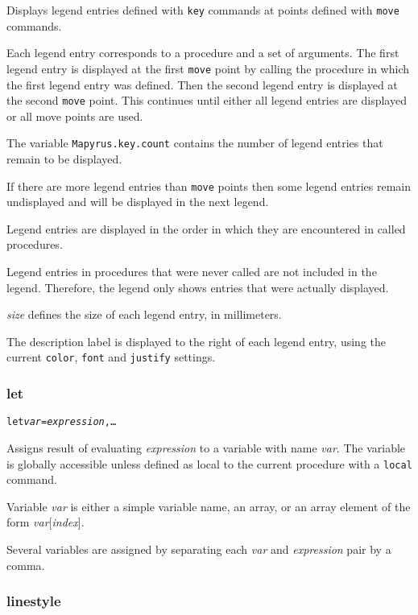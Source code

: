 Displays legend entries defined with
\texttt{key} commands at points defined with
\texttt{move} commands.

Each legend entry corresponds to a procedure and a set of arguments.  The first
legend entry is displayed at the first \texttt{move} point by calling the
procedure in which the first legend entry was defined.  Then the second legend
entry is displayed at the second \texttt{move} point.  This continues until
either all legend entries are displayed or all move points are used.

The variable
\texttt{Mapyrus.key.count}
contains the number of legend entries that remain to be displayed.

If there are more legend entries than 
\texttt{move} points then some legend entries
remain undisplayed and will be displayed in the next legend.

Legend entries are displayed in the order in which they
are encountered in called procedures.

Legend entries in procedures that were never called are
not included in the legend.  Therefore, the legend only shows
entries that were actually displayed.

\textit{size} defines the size of each legend entry, in millimeters.

The description label is displayed to the right of each legend entry, using the
current \texttt{color}, \texttt{font} and \texttt{justify} settings.

\subsubsection{let}

\begin{alltt}
let \textit{var} = \textit{expression}, \dots
\end{alltt}

Assigns result of evaluating \textit{expression} to a variable with name
\textit{var}.  The variable is globally accessible unless defined as local to
the current procedure with a \texttt{local} command.

Variable \textit{var} is either a simple variable name, an array, or an array
element of the form \textit{var}[\textit{index}].

Several variables are assigned by separating each 
\textit{var} and \textit{expression} pair by a comma.

\subsubsection{linestyle}

